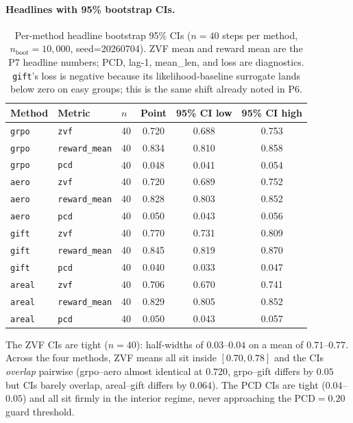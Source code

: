 \paragraph{Headlines with 95\% bootstrap CIs.}

\begin{table}[t]
\centering
\caption{Per-method headline bootstrap 95\% CIs
($n{=}40$ steps per method,
$n_{\text{boot}}{=}10{,}000$, seed=20260704). ZVF mean and reward
mean are the P7 headline numbers; PCD, lag-1, mean\_len, and loss
are diagnostics. \texttt{gift}'s loss is negative because its
likelihood-baseline surrogate lands below zero on easy groups; this
is the same shift already noted in P6.}
\label{tab:p7-headline-cis}
\begin{tabular}{lllccc}
\toprule
Method & Metric & $n$ & Point & 95\% CI low & 95\% CI high \\
\midrule
\texttt{grpo}  & \texttt{zvf}          & 40 & 0.720 & 0.688 & 0.753 \\
\texttt{grpo}  & \texttt{reward\_mean} & 40 & 0.834 & 0.810 & 0.858 \\
\texttt{grpo}  & \texttt{pcd}          & 40 & 0.048 & 0.041 & 0.054 \\
\texttt{aero}  & \texttt{zvf}          & 40 & 0.720 & 0.689 & 0.752 \\
\texttt{aero}  & \texttt{reward\_mean} & 40 & 0.828 & 0.803 & 0.852 \\
\texttt{aero}  & \texttt{pcd}          & 40 & 0.050 & 0.043 & 0.056 \\
\texttt{gift}  & \texttt{zvf}          & 40 & 0.770 & 0.731 & 0.809 \\
\texttt{gift}  & \texttt{reward\_mean} & 40 & 0.845 & 0.819 & 0.870 \\
\texttt{gift}  & \texttt{pcd}          & 40 & 0.040 & 0.033 & 0.047 \\
\texttt{areal} & \texttt{zvf}          & 40 & 0.706 & 0.670 & 0.741 \\
\texttt{areal} & \texttt{reward\_mean} & 40 & 0.829 & 0.805 & 0.852 \\
\texttt{areal} & \texttt{pcd}          & 40 & 0.050 & 0.043 & 0.057 \\
\bottomrule
\end{tabular}
\end{table}

The ZVF CIs are tight ($n{=}40$): half-widths of $0.03$--$0.04$
on a mean of $0.71$--$0.77$. Across the four methods, ZVF means
all sit inside $[0.70, 0.78]$ and the CIs \emph{overlap} pairwise
(grpo--aero almost identical at $0.720$, grpo--gift differs by
$0.05$ but CIs barely overlap, areal--gift differs by $0.064$).
The PCD CIs are tight ($0.04$--$0.05$) and all sit firmly in the
interior regime, never approaching the $\mathrm{PCD} = 0.20$ guard
threshold.

